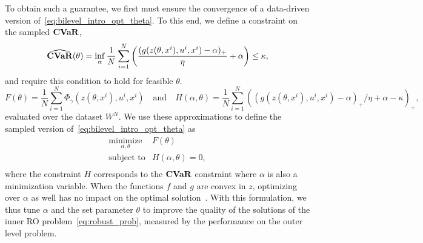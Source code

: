 To obtain such a guarantee, we first must ensure the convergence of a data-driven version of~\eqref{eq:bilevel_intro_opt_theta}.
To this end, we define a constraint on the sampled $\mathop{\bf CVaR}$,
\begin{equation}
\label{eq:sampled_cvar}
\widehat{\mathop{\bf CVaR}}(\theta) = \inf_{\alpha} \frac{1}{N}\sum_{i=1}^N \left(\frac{(g(z(\theta,x^i),u^i,x^i)- \alpha)_+}{\eta} + \alpha \right)\leq \kappa,
\end{equation}
and require this condition to hold for feasible $\theta$.
\begin{equation*}
F(\theta) = \frac{1}{N}\sum_{i=1}^N\Phi_{\gamma}(z(\theta,x^i),u^i, x^i) \quad \text{and}\quad H(\alpha,\theta) = \frac{1}{N}\sum_{i=1}^N ((g(z(\theta,x^i),u^i,x^i)- \alpha)_+/\eta + \alpha - \kappa)_+,
\end{equation*}
evaluated over the dataset 
$W^N$. We use these approximations to define the sampled version of~\eqref{eq:bilevel_intro_opt_theta} as
\begin{equation}
	\label{eq:bilevel_sampled}
	\begin{array}{ll}
		\underset{\alpha,\theta}{\mbox{minimize}} & F(\theta) \\
		\mbox{subject to} & H(\alpha,\theta) = 0,\\
	\end{array}
\end{equation}
where the constraint $H$ corresponds to the $\mathop{\bf CVaR}$ constraint where $\alpha$ is also a minimization variable.
When the functions $f$ and $g$ are convex in $z$, optimizing over $\alpha$ as well has no impact on the optimal solution~\citep{cvar_ref}.
With this formulation, we thus tune $\alpha$ and the set parameter $\theta$ to improve the quality of the solutions  of the inner \gls{RO} problem~\eqref{eq:robust_prob}, measured by the performance on the outer level problem.


